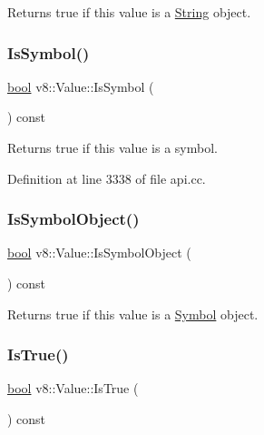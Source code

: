 Returns true if this value is a \mbox{\hyperlink{classv8_1_1String}{String}} object. \mbox{\label{classv8_1_1Value_a0fee90dc2589b156d277a74b0b225a71}} 
\subsubsection{\texorpdfstring{Is\+Symbol()}{IsSymbol()}}
{\footnotesize\ttfamily \mbox{\hyperlink{classbool}{bool}} v8\+::\+Value\+::\+Is\+Symbol (\begin{DoxyParamCaption}{ }\end{DoxyParamCaption}) const}

Returns true if this value is a symbol. 

Definition at line 3338 of file api.\+cc.

\mbox{\label{classv8_1_1Value_a1d5507f09734f8062a0d0a9a78496b2a}} 
\subsubsection{\texorpdfstring{Is\+Symbol\+Object()}{IsSymbolObject()}}
{\footnotesize\ttfamily \mbox{\hyperlink{classbool}{bool}} v8\+::\+Value\+::\+Is\+Symbol\+Object (\begin{DoxyParamCaption}{ }\end{DoxyParamCaption}) const}

Returns true if this value is a \mbox{\hyperlink{classv8_1_1Symbol}{Symbol}} object. \mbox{\label{classv8_1_1Value_a48c300598bad0155eb59965c9e6b86b6}} 
\subsubsection{\texorpdfstring{Is\+True()}{IsTrue()}}
{\footnotesize\ttfamily \mbox{\hyperlink{classbool}{bool}} v8\+::\+Value\+::\+Is\+True (\begin{DoxyParamCaption}{ }\end{DoxyParamCaption}) const}

